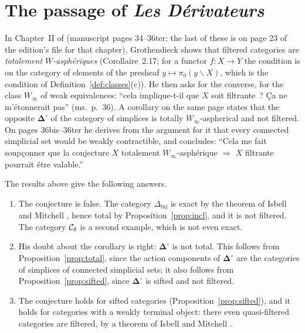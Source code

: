 \section{The passage of \emph{Les D\'erivateurs}}\label{sec:manuscript}

In Chapter~II of \cite{Der} (manuscript pages 34--36ter; the last of these is on page 23 of
the edition's file for that chapter), Grothendieck shows that filtered
categories are \emph{totalement $W$-asph\'eriques} (Corollaire~2.17; for a
functor $f\colon X\to Y$ the condition is on the category of elements of the
presheaf $y\mapsto\pi_0(y\backslash X)$, which is the condition of
Definition~\ref{def:classes}(c)). He then asks for the converse, for the
class $W_\infty$ of weak equivalences: ``cela implique-t-il que $X$ soit
filtrante~? \c{C}a ne m'\'etonnerait pas'' (ms.~p.~36). A corollary on the
same page states that the opposite $\boldsymbol\Delta^{\circ}$ of the
category of simplices is totally $W_\infty$-aspherical and not filtered. On
pages 36bis--36ter he derives from the argument for it that every connected
simplicial set would be weakly contractible, and concludes: ``Cela me fait
soup\c{c}onner que la conjecture
$X$ totalement $W_\infty$-asph\'erique $\Longrightarrow$ $X$ filtrante
pourrait \^etre valable.''

The results above give the following answers.
\begin{enumerate}
\item The conjecture is false. The category $\Delta_{\mathrm{inj}}$ is exact
 by the theorem of Isbell and Mitchell \cite[Theorem~3]{IM73}, hence total
 by Proposition~\ref{prop:incl}, and it is not filtered. The category $\mathcal{C}_{\delta}$
 is a second example, which is not even exact.
\item His doubt about the corollary is right: $\boldsymbol\Delta^{\circ}$ is
 not total. This follows from Proposition~\ref{prop:total}, since the
 action components of $\boldsymbol\Delta^{\circ}$ are the categories of
 simplices of connected simplicial sets; it also follows from
 Proposition~\ref{prop:sifted}, since $\boldsymbol\Delta^{\circ}$ is sifted
 and not filtered.
\item The conjecture holds for sifted categories
 (Proposition~\ref{prop:sifted}), and it holds for categories with a weakly
 terminal object: there even quasi-filtered categories are filtered, by a
 theorem of Isbell and Mitchell \cite[Corollary~4.4]{IM76}.
\end{enumerate}
